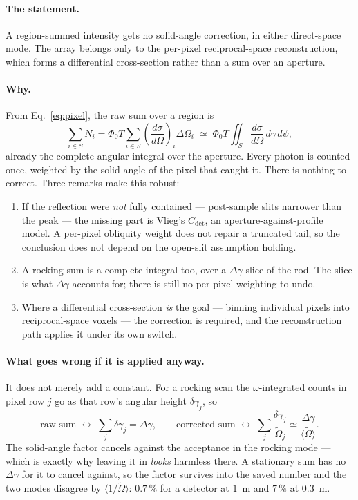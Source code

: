 \documentclass[11pt,a4paper]{article}
\newcommand{\dgam}{\Delta\gamma}
\newcommand{\dOm}{\Delta\Omega}
\newcommand{\Ored}{\widetilde{\Omega}}
\newcommand{\Cdet}{C_{\mathrm{det}}}
\begin{document}
\paragraph{The statement.} A region-summed intensity gets no solid-angle
correction, in either direct-space mode. The array belongs only to the
per-pixel reciprocal-space reconstruction, which forms a differential
cross-section rather than a sum over an aperture.

\paragraph{Why.} From Eq.~\eqref{eq:pixel}, the raw sum over a region is
\begin{equation}
  \sum_{i\in S} N_i
  = \Phi_0 T \sum_{i \in S} \left(\frac{d\sigma}{d\Omega}\right)_{\!i} \dOm_i
  \;\simeq\; \Phi_0 T \iint_{S} \frac{d\sigma}{d\Omega}\, d\gamma\, d\psi ,
\end{equation}
already the complete angular integral over the aperture. Every photon is
counted once, weighted by the solid angle of the pixel that caught it. There
is nothing to correct. Three remarks make this robust:

\begin{enumerate}[leftmargin=1.6em]
\item If the reflection were \emph{not} fully contained --- post-sample slits
  narrower than the peak --- the missing part is Vlieg's $\Cdet$, an
  aperture-against-profile model. A per-pixel obliquity weight does not repair
  a truncated tail, so the conclusion does not depend on the open-slit
  assumption holding.
\item A rocking sum is a complete integral too, over a $\dgam$ slice of the
  rod. The slice is what $\dgam$ accounts for; there is still no per-pixel
  weighting to undo.
\item Where a differential cross-section \emph{is} the goal --- binning
  individual pixels into reciprocal-space voxels --- the correction is
  required, and the reconstruction path applies it under its own switch.
\end{enumerate}

\paragraph{What goes wrong if it is applied anyway.} It does not merely add a
constant. For a rocking scan the $\omega$-integrated counts in pixel row $j$
go as that row's angular height $\delta\gamma_j$, so
\begin{equation}
  \text{raw sum} \;\longleftrightarrow\; \sum_j \delta\gamma_j = \dgam ,
  \qquad
  \text{corrected sum} \;\longleftrightarrow\;
      \sum_j \frac{\delta\gamma_j}{\Ored_j} \simeq \frac{\dgam}{\langle\Ored\rangle} .
  \label{eq:partners}
\end{equation}
The solid-angle factor cancels against the acceptance in the rocking mode ---
which is exactly why leaving it in \emph{looks} harmless there. A stationary
sum has no $\dgam$ for it to cancel against, so the factor survives into the
saved number and the two modes disagree by $\langle 1/\Ored\rangle$: $0.7\,\%$
for a detector at $1$~m and $7\,\%$ at $0.3$~m.
\end{document}
